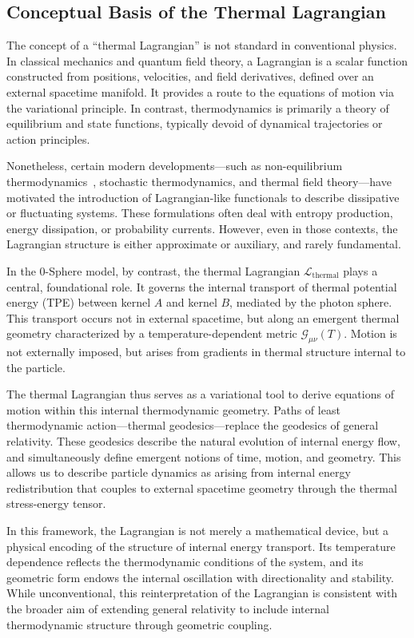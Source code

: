 \documentclass[%
 reprint,
 amsmath,amssymb,
 aps,
]{revtex4-1}
\numberwithin{equation}{section}%
\begin{document}
\subsection{Conceptual Basis of the Thermal Lagrangian}
\label{subsec:conceptual_basis}

The concept of a ``thermal Lagrangian'' is not standard in conventional physics. In classical mechanics and quantum field theory, a Lagrangian is a scalar function constructed from positions, velocities, and field derivatives, defined over an external spacetime manifold. It provides a route to the equations of motion via the variational principle. In contrast, thermodynamics is primarily a theory of equilibrium and state functions, typically devoid of dynamical trajectories or action principles.

Nonetheless, certain modern developments—such as non-equilibrium thermodynamics~\cite{jarzynski2011}, stochastic thermodynamics, and thermal field theory—have motivated the introduction of Lagrangian-like functionals to describe dissipative or fluctuating systems. These formulations often deal with entropy production, energy dissipation, or probability currents. However, even in those contexts, the Lagrangian structure is either approximate or auxiliary, and rarely fundamental.

In the 0-Sphere model, by contrast, the thermal Lagrangian $\mathcal{L}_{\text{thermal}}$ plays a central, foundational role. It governs the internal transport of thermal potential energy (TPE) between kernel $A$ and kernel $B$, mediated by the photon sphere. This transport occurs not in external spacetime, but along an emergent thermal geometry characterized by a temperature-dependent metric $\mathcal{G}_{\mu\nu}(T)$. Motion is not externally imposed, but arises from gradients in thermal structure internal to the particle.

The thermal Lagrangian thus serves as a variational tool to derive equations of motion within this internal thermodynamic geometry. Paths of least thermodynamic action—thermal geodesics—replace the geodesics of general relativity. These geodesics describe the natural evolution of internal energy flow, and simultaneously define emergent notions of time, motion, and geometry. This allows us to describe particle dynamics as arising from internal energy redistribution that couples to external spacetime geometry through the thermal stress-energy tensor.

In this framework, the Lagrangian is not merely a mathematical device, but a physical encoding of the structure of internal energy transport. Its temperature dependence reflects the thermodynamic conditions of the system, and its geometric form endows the internal oscillation with directionality and stability. While unconventional, this reinterpretation of the Lagrangian is consistent with the broader aim of extending general relativity to include internal thermodynamic structure through geometric coupling.
\end{document}
